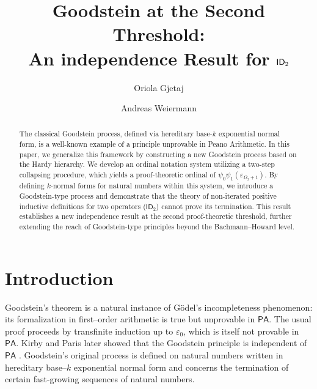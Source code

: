 \documentclass{amsart}
\title[Goodstein at the Second Threshold]{\texorpdfstring{Goodstein at the Second Threshold:\\ An independence Result for $\sf ID_2$}{Goodstein at the Second Threshold: An Independence Result for ID2}}
\author[O. Gjetaj]{Oriola Gjetaj}
\author[A. Weiermann]{Andreas Weiermann}
\theoremstyle{plain}
\theoremstyle{plain}
\newcommand{\ID}{\mathsf{ID}}
\newcommand{\PA}{\mathsf{PA}}
\newcommand{\Om}{{\Omega}}
\begin{document}
\begin{abstract}
The classical Goodstein process, defined via hereditary base-$k$ exponential normal form, is a well-known example of a principle unprovable in Peano Arithmetic. 
In this paper, we generalize this framework by constructing a new Goodstein process based on the Hardy hierarchy. We develop an ordinal notation system utilizing a two-step collapsing procedure, which yields a proof-theoretic ordinal of $\psi_0\psi_1(\varepsilon_{\Om_2+1})$. By defining $k$-normal forms for natural numbers within this system, we introduce a Goodstein-type process and demonstrate that the theory of non-iterated positive inductive definitions for two operators ($\ID_2$) cannot prove its termination. This result establishes a new independence result at the second proof-theoretic threshold, further extending the reach of Goodstein-type principles beyond the Bachmann–Howard level.
\end{abstract}
\maketitle




\section{Introduction}\label{sec: Intro}
Goodstein’s theorem \cite{Goodstein1944} is a natural instance of Gödel’s incompleteness phenomenon: its formalization in first–order arithmetic is true but unprovable in $\PA$. The usual proof proceeds by transfinite induction up to $\varepsilon_0$, which is itself not provable in $\PA$. Kirby and Paris later showed that the Goodstein principle is independent of $\PA$ \cite{Kirby.Paris1982}.
Goodstein’s original process is defined on natural numbers written in hereditary base–$k$ exponential normal form and concerns the termination of certain fast-growing sequences of natural numbers.
\end{document}
